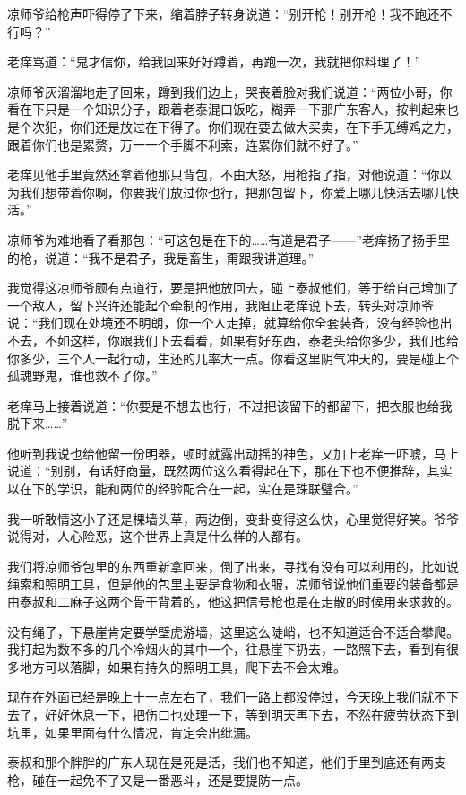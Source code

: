 凉师爷给枪声吓得停了下来，缩着脖子转身说道：“别开枪！别开枪！我不跑还不行吗？”

老痒骂道：“鬼才信你，给我回来好好蹲着，再跑一次，我就把你料理了！”

凉师爷灰溜溜地走了回来，蹲到我们边上，哭丧着脸对我们说道：“两位小哥，你看在下只是一个知识分子，跟着老泰混口饭吃，糊弄一下那广东客人，按判起来也是个次犯，你们还是放过在下得了。你们现在要去做大买卖，在下手无缚鸡之力，跟着你们也是累赘，万一一个手脚不利索，连累你们就不好了。”

老痒见他手里竟然还拿着他那只背包，不由大怒，用枪指了指，对他说道：“你以为我们想带着你啊，你要我们放过你也行，把那包留下，你爱上哪儿快活去哪儿快活。”

凉师爷为难地看了看那包：“可这包是在下的……有道是君子——”老痒扬了扬手里的枪，说道：“我不是君子，我是畜生，甭跟我讲道理。”

我觉得这凉师爷颇有点道行，要是把他放回去，碰上泰叔他们，等于给自己增加了一个敌人，留下兴许还能起个牵制的作用，我阻止老痒说下去，转头对凉师爷说：“我们现在处境还不明朗，你一个人走掉，就算给你全套装备，没有经验也出不去，不如这样，你跟我们下去看看，如果有好东西，泰老头给你多少，我们也给你多少，三个人一起行动，生还的几率大一点。你看这里阴气冲天的，要是碰上个孤魂野鬼，谁也救不了你。”

老痒马上接着说道：“你要是不想去也行，不过把该留下的都留下，把衣服也给我脱下来……”

他听到我说也给他留一份明器，顿时就露出动摇的神色，又加上老痒一吓唬，马上说道：“别别，有话好商量，既然两位这么看得起在下，那在下也不便推辞，其实以在下的学识，能和两位的经验配合在一起，实在是珠联璧合。”

我一听敢情这小子还是棵墙头草，两边倒，变卦变得这么快，心里觉得好笑。爷爷说得对，人心险恶，这个世界上真是什么样的人都有。

我们将凉师爷包里的东西重新拿回来，倒了出来，寻找有没有可以利用的，比如说绳索和照明工具，但是他的包里主要是食物和衣服，凉师爷说他们重要的装备都是由泰叔和二麻子这两个骨干背着的，他这把信号枪也是在走散的时候用来求救的。

没有绳子，下悬崖肯定要学壁虎游墙，这里这么陡峭，也不知道适合不适合攀爬。我打起为数不多的几个冷烟火的其中一个，往悬崖下扔去，一路照下去，看到有很多地方可以落脚，如果有持久的照明工具，爬下去不会太难。

现在在外面已经是晚上十一点左右了，我们一路上都没停过，今天晚上我们就不下去了，好好休息一下，把伤口也处理一下，等到明天再下去，不然在疲劳状态下到坑里，如果里面有什么情况，肯定会出纰漏。

泰叔和那个胖胖的广东人现在是死是活，我们也不知道，他们手里到底还有两支枪，碰在一起免不了又是一番恶斗，还是要提防一点。

